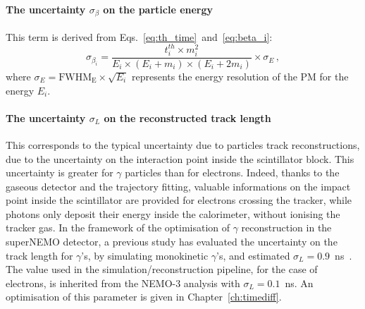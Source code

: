 \paragraph{The uncertainty $\sigma_{\beta}$ on the particle energy}
This term is derived from Eqs.~\eqref{eq:th_time}~and~\eqref{eq:beta_i}:
\begin{equation}
  \sigma_{\beta_{i}} = \frac{t^{th}_{i}\times m_{i}^{2}}{E_{i}\times (E_{i}+m_{i})\times (E_{i}+2m_{i})}\times \sigma_{E}\,,
  \label{eq:sigma_L}
\end{equation}
where $\sigma_{E}= \text{FWHM}_{\text{E}} \times \sqrt{E_{i}}$ represents the energy resolution of the PM for the energy $E_{i}$.

\paragraph{The uncertainty $\sigma_{L}$ on the reconstructed track length}
This corresponds to the typical uncertainty due to particles track reconstructions, due to the uncertainty on the interaction point inside the scintillator block.
This uncertainty is greater for $\gamma$ particles than for electrons.
Indeed, thanks to the gaseous detector and the trajectory fitting, valuable informations on the impact point inside the scintillator are provided for electrons crossing the tracker, while photons only deposit their energy inside the calorimeter, without ionising the tracker gas.
In the framework of the optimisation of $\gamma$ reconstruction in the superNEMO detector, a previous study has evaluated the uncertainty on the track length for $\gamma$'s, by simulating monokinetic $\gamma$'s, and estimated $\sigma_{L}=0.9$~ns~\cite{CalvezThesis}.
The value used in the simulation/reconstruction pipeline, for the case of electrons, is inherited from the NEMO-$3$ analysis with $\sigma_{L}=0.1$~ns.
An optimisation of this parameter is given in Chapter~\ref{ch:timediff}.

\paragraph{}

